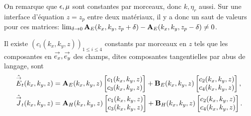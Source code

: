       On remarque que \(\epsilon,\mu\) sont constantes par morceaux, donc \(k,\eta_r\) aussi.
      Sur une interface d'équation \(z=z_p\) entre deux matériaux, il y a donc un saut de valeurs pour ces matrices: \(\lim_{\delta\rightarrow 0 } \mathbf{A}_E(k_x,k_y,z_p+ \delta) - \mathbf{A}_E(k_x,k_y,z_p - \delta) \not = 0\).
      \begin{prop}
          Il existe \((c_i(k_x,k_y,z))_{1\le i \le4}\) constants par morceaux en \(z\) tels que les composantes en \({\overset{\rightarrow}{e_x}},{\overset{\rightarrow}{e_y}}\) des champs, dites composantes tangentielles par abus de langage, sont
          \begin{align*}
              \hat{{\overset{\rightarrow}{E}}}_t(k_x,k_y,z) &= \mathbf{A}_E(k_x,k_y,z) \begin{bmatrix}c_1(k_x,k_y,z) \\ c_3(k_x,k_y,z)\end{bmatrix} + \mathbf{B}_E(k_x,k_y,z) \begin{bmatrix}c_2(k_x,k_y,z) \\ c_4(k_x,k_y,z)\end{bmatrix},
              \\
             \hat{{\overset{\rightarrow}{J}}}_t(k_x,k_y,z) &= \mathbf{A}_H(k_x,k_y,z) \begin{bmatrix}c_1(k_x,k_y,z) \\ c_3(k_x,k_y,z)\end{bmatrix} + \mathbf{B}_H(k_x,k_y,z) \begin{bmatrix}c_2(k_x,k_y,z) \\ c_4(k_x,k_y,z)\end{bmatrix}.
          \end{align*}
      \end{prop}

